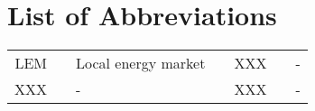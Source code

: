 \section*{List of Abbreviations}

\begin{tabular}{rp{0.2cm}lp{1cm}rp{0.2cm}l}
    LEM     & &  Local energy market    & & XXX     & &  -  \\
    XXX     & &  -                      & & XXX     & &  -
\end{tabular}
